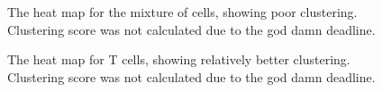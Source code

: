 \documentclass[3p,authoryear,preprint,12pt]{elsarticle}
\makeatletter
\def\fixFloatSize#1{}%
\makeatother
\begin{document}
\bgroup
\fixFloatSize{img/mixHeatmap.png}
\begin{figure}[!htbp]
	\centering \makeatletter{}
	\makeatother 
	\caption{{The heat map for the mixture of cells, showing poor clustering. Clustering score was not calculated due to the god damn deadline.}}
	\label{f-c2b15a1bacb9}
\end{figure}
\egroup
\bgroup
\fixFloatSize{img/THeatmap.png}
\begin{figure}[!htbp]
	\centering \makeatletter{}
	\makeatother 
	\caption{{The heat map for T cells, showing relatively better clustering. Clustering score was not calculated due to the god damn deadline.}}
	\label{f-c2b15a1bacc9}
\end{figure}
\end{document}
